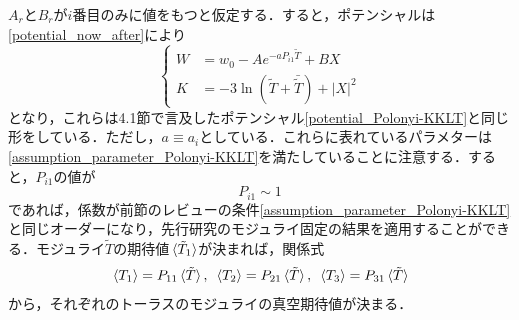 \documentclass[a4paper,uplatex,dvipdfmx,10pt]{jsarticle}
\theoremstyle{definition}
\begin{document}
$A_{r}$と$B_{r}$が$i$番目のみに値をもつと仮定する．すると，ポテンシャルは\eqref{potential_now_after}により
\begin{equation}
   \left\{
      \begin{alignedat}{1}
         W
         &=w_{0}
         -
         A
         e^{-aP_{i1}\tilde{T}}
         +
         B
         X
         \\
         K
         &=
         -
         3\ln(\tilde{T}+\bar{\tilde{T}})
         +
         |X|^2
      \end{alignedat}
   \right.
   \nonumber
\end{equation}
となり，これらは4.1節で言及したポテンシャル\eqref{potential_Polonyi-KKLT}と同じ形をしている．ただし，$a\equiv a_{i}$としている．これらに表れているパラメターは\eqref{assumption_parameter_Polonyi-KKLT}を満たしていることに注意する．すると，$P_{i1}$の値が
\begin{equation}
   P_{i1}
   \sim
   1
   \label{cond_P}
\end{equation}
であれば，係数が前節のレビューの条件\eqref{assumption_parameter_Polonyi-KKLT}と同じオーダーになり，先行研究のモジュライ固定の結果を適用することができる．モジュライ$\tilde{T}$の期待値$\ev*{\tilde{T}_{1}}$が決まれば，関係式
\begin{equation}
   \ev*{T_{1}}
   =
   P_{11}\ev*{\tilde{T}}
   ,\ 
   \ev*{T_{2}}
   =
   P_{21}\ev*{\tilde{T}}
   ,\ 
   \ev*{T_{3}}
   =
   P_{31}\ev*{\tilde{T}}
   \label{relation_moduli}
\end{equation}
から，それぞれのトーラスのモジュライの真空期待値が決まる．
\end{document}

